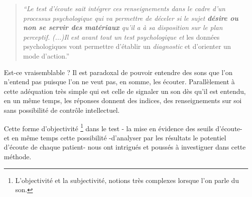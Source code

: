 \begin{quote}
\emph{``Le test d'écoute sait intégrer ces renseignements dans le
cadre d'un processus psychologique qui va permettre de déceler si
le sujet\textbf{ désire ou non se servir des matériaux }qu'il a à sa disposition
sur le plan perceptif. (...)Il est avant tout un test psychologique
et} les données psychologiques vont permettre d'établir un\emph{ diagnostic}
et d'orienter un mode d'action.''
\end{quote}

Est-ce vraisemblable ?
Il est paradoxal de pouvoir  entendre des sons que l'on
n'entend pas puisque l'on ne veut pas, en somme, les écouter. Parallèlement à cette
adéquation très simple qui est celle de signaler un son dès qu'il est 
entendu, en un même temps, les
réponses donnent des indices, des renseignements sur soi sans possibilité de 
contrôle intellectuel.


Cette forme d'objectivité \footnote{L'objectivité et la
  subjectivité, notions très complexes lorsque l'on parle du
  son.} dans le test - la mise en évidence des seuils d'écoute- et en
même temps cette possibilité -d'analyser par les résultats le potentiel d'écoute de
chaque patient- nous ont intrigués et poussés à investiguer dans cette méthode.
 





